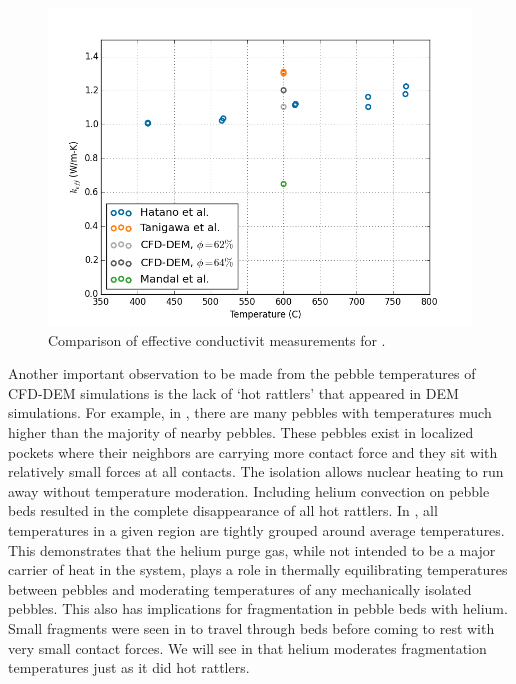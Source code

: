 \begin{figure}[ht]
\centering
    \includegraphics[width=\singleimagewidth]{figures/initial_packing_study/keff-he-comparisons.png}
    \caption{Comparison of effective conductivit measurements for \lit.}
    \label{fig:keff-cfd-comparisons}
\end{figure}


Another important observation to be made from the pebble temperatures of CFD-DEM simulations is the lack of `hot rattlers' that appeared in DEM simulations. For example, in , there are many pebbles with temperatures much higher than the majority of nearby pebbles. These pebbles exist in localized pockets where their neighbors are carrying more contact force and they sit with relatively small forces at all contacts. The isolation allows nuclear heating to run away without temperature moderation. Including helium convection on pebble beds resulted in the complete disappearance of all hot rattlers. In , all temperatures in a given region are tightly grouped around average temperatures. This demonstrates that the helium purge gas, while not intended to be a major carrier of heat in the system, plays a role in thermally equilibrating temperatures between pebbles and moderating temperatures of any mechanically isolated pebbles. This also has implications for fragmentation in pebble beds with helium. Small fragments were seen in  to travel through beds before coming to rest with very small contact forces. We will see in  that helium moderates fragmentation temperatures just as it did hot rattlers.











